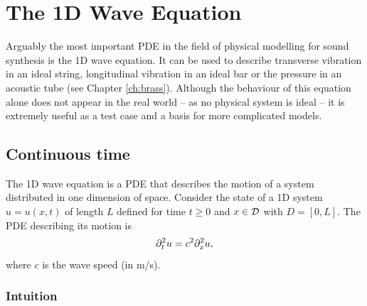     
    
    

\section{%
The 1D Wave Equation}\label{sec:1DWave}
Arguably the most important PDE in the field of physical modelling for sound synthesis is the 1D wave equation. It can be used to describe transverse vibration in an ideal string, longitudinal vibration in an ideal bar or the pressure in an acoustic tube (see Chapter \ref{ch:brass}). Although the behaviour of this equation alone does not appear in the real world \SWcomment[as such] -- as no physical system is ideal -- it is extremely useful as a test case and a basis for more complicated models. %

\subsection{Continuous time}
The 1D wave equation is a PDE that describes the motion of a system distributed in one dimension of space. Consider the state of a 1D system $u=u(x,t)$ of length $L$ defined for time $t\geq 0$ and $x\in \mathcal{D}$ with $D = [0, L]$. The PDE describing its motion is
\begin{equation}\label{eq:1DwavePDE}
    \partial_t^2 u = c^2 \partial_x^2 u,
\end{equation}
where $c$ is the wave speed (in m/s). 

\subsubsection{Intuition}




